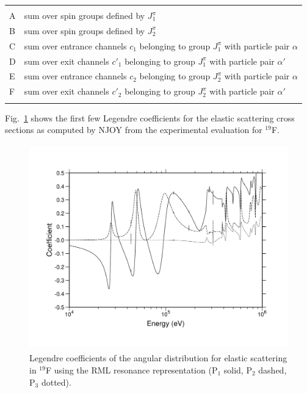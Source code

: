 \begin{tabular}{ll}
    &                                                              \\
 A & sum over spin groups defined by $J^\pi_1$ \\
 B & sum over spin groups defined by $J^\pi_2$ \\
 C & sum over entrance channels $c_1$ belonging
    to group $J^\pi_1$ with particle pair $\alpha$ \\
 D & sum over exit channels $c'_1$ belonging
    to group $J^\pi_1$ with particle pair $\alpha'$ \\
 E & sum over entrance channels $c_2$ belonging
    to group $J^\pi_2$ with particle pair $\alpha$ \\
 F & sum over exit channels $c'_2$ belonging
    to group $J^\pi_2$ with particle pair $\alpha'$ \\
    &                                                              \\
\end{tabular}

\noindent Fig.~\ref{adist} shows the first few Legendre
coefficients for the elastic scattering cross sections as
computed by NJOY from the experimental evaluation for $^{19}$F.

\begin{figure}[ht]\centering
\includegraphics[height=3.5in, angle=0]{figs/adist_ack}
\caption[$^{19}$F elastic scattering Legendre coefficients from RML data]
  {Legendre coefficients of the angular distribution for
   elastic scattering in $^{19}$F using the RML resonance
   representation (P$_1$ solid, P$_2$ dashed, P$_3$ dotted).}
\label{adist}
\end{figure}

